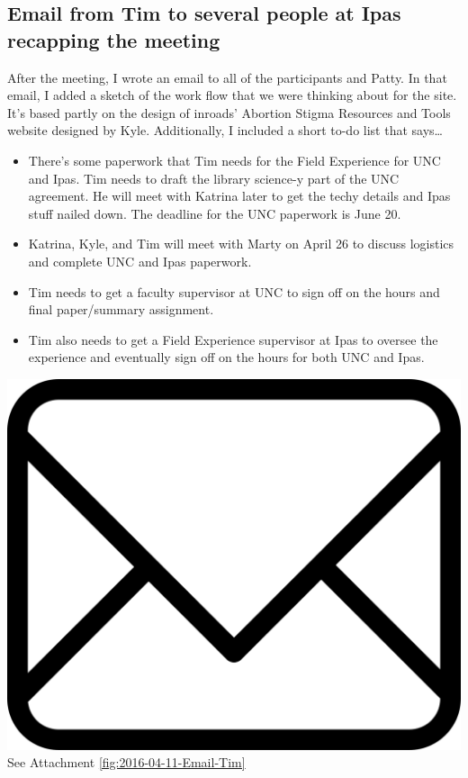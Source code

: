 \documentclass{article}
\begin{document}
\subsection{Email from Tim to several people at Ipas recapping the meeting}
After the meeting, I wrote an email to all of the participants and Patty. In that email, I added a sketch of the work flow that we were thinking about for the site. It's based partly on the design of inroads' Abortion Stigma Resources and Tools website designed by Kyle. Additionally, I included a short to-do list that says\dots
\begin{itemize}
\itemsep0em 
    \item There’s some paperwork that Tim needs for the Field Experience for UNC and Ipas. Tim needs to draft the library science-y part of the UNC agreement. He will meet with Katrina later to get the techy details and Ipas stuff nailed down. The deadline for the UNC paperwork is June 20.
    \item Katrina, Kyle, and Tim will meet with Marty on April 26 to discuss logistics and complete UNC and Ipas paperwork.
    \item Tim needs to get a faculty supervisor at UNC to sign off on the hours and final paper/summary assignment. \item Tim also needs to get a Field Experience supervisor at Ipas to oversee the experience and eventually sign off on the hours for both UNC and Ipas.
\end{itemize}

\vspace{2em}
\noindent\includegraphics[height=\fontcharht\font`\B]{icons/attachment-email} See Attachment \ref{fig:2016-04-11-Email-Tim}
\vspace{2em}
\end{document}
